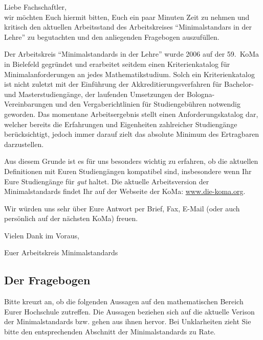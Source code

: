 \documentclass[a4paper,11pt]{article}
\begin{document}
\headlayout
{}
    
\subject{Evaluationsbogen zu den Minimalstandards der Mathematik}

Liebe Fachschaftler,\\

wir möchten Euch hiermit bitten, Euch ein paar Minuten Zeit zu nehmen und kritisch den aktuellen Arbeitsstand des Arbeitskreises "`Minimalstandars in der Lehre"' zu begutachten und den anliegenden Fragebogen auszufüllen.

Der Arbeitskreis "`Minimalstandards in der Lehre"' wurde 2006 auf der 59.~KoMa in Bielefeld gegründet und erarbeitet seitdem einen Kriterienkatalog für Minimalanforderungen an jedes Mathematikstudium. Solch ein Kriterienkatalog ist nicht zuletzt mit der Einführung der Akkreditierungsverfahren für Bachelor- und Masterstudiengänge, der laufenden Umsetzungen der Bologna-Vereinbarungen und den Vergaberichtlinien für Studiengebühren notwendig geworden. Das momentane Arbeitsergebnis stellt einen Anforderungskatalog dar, welcher bereits die Erfahrungen und Eigenheiten zahlreicher Studiengänge berücksichtigt, jedoch immer darauf zielt das absolute Minimum des Ertragbaren darzustellen. 

Aus diesem Grunde ist es für uns besonders wichtig zu erfahren, ob die aktuellen Definitionen mit Euren Studiengängen kompatibel sind, insbesondere wenn Ihr Eure Studiengänge für \emph{gut} haltet. Die aktuelle Arbeitsversion der Minimalstandards findet Ihr auf der Webseite der KoMa: \url{www.die-koma.org}.

Wir würden uns sehr über Eure Antwort per Brief, Fax, E-Mail (oder auch persönlich auf der nächsten KoMa) freuen.\bigskip

Vielen Dank im Voraus,

Euer Arbeitskreis Minimalstandards

\pagebreak

\subsection*{Der Fragebogen}

Bitte kreuzt an, ob die folgenden Aussagen auf den mathematischen Bereich Eurer Hochschule zutreffen.
Die Aussagen beziehen sich auf die aktuelle Verison der Minimalstandards bzw. gehen aus ihnen hervor.
Bei Unklarheiten zieht Sie bitte den entsprechenden Abschnitt der Minimalstandards zu Rate.
\small
\end{document}
